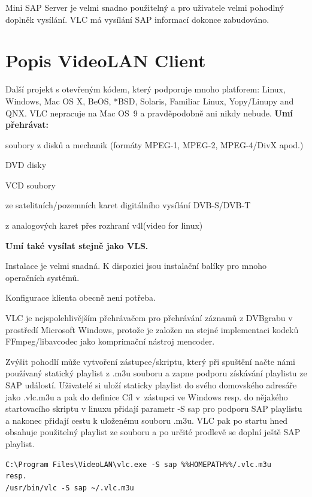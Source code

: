 Mini SAP Server je velmi snadno použitelný a pro uživatele velmi pohodlný doplněk vysílání. VLC má vysílání SAP informací dokonce zabudováno.

\section{Popis VideoLAN Client}

Další projekt s otevřeným kódem, který podporuje mnoho platforem: Linux, Windows, Mac OS X, BeOS, *BSD, Solaris, Familiar Linux, Yopy/Linupy and QNX. VLC nepracuje na Mac OS\ 9 a pravděpodobně ani nikdy nebude.
\vfill
\pagebreak
\textbf{Umí přehrávat:}
\bitem
\item soubory z disků a mechanik (formáty MPEG-1, MPEG-2, MPEG-4/DivX apod.)
\item DVD disky
\item VCD soubory
\item ze satelitních/pozemních karet digitálního vysílání DVB-S/DVB-T
\item z analogových karet přes rozhraní v4l(video for linux)
\eitem

\textbf{Umí také vysílat stejně jako VLS.}

Instalace je velmi snadná. K dispozici jsou instalační balíky pro mnoho operačních systémů.

Konfigurace klienta obecně není potřeba. 

VLC je nejspolehlivějším přehrávačem pro přehrávání záznamů z DVBgrabu v prostředí Microsoft Windows, protože je založen na stejné implementaci kodeků FFmpeg/libavcodec jako komprimační nástroj mencoder.

Zvýšit pohodlí může vytvoření zástupce/skriptu, který při spuštění načte námi používaný statický playlist z .m3u souboru a zapne podporu získávání playlistu ze SAP událostí. Uživatelé si uloží staticky playlist do svého domovského adresáře jako .vlc.m3u a pak do definice Cíl v~zástupci ve Windows resp. do nějakého startovacího skriptu v linuxu přidají parametr -S sap pro podporu SAP playlistu a nakonec přidají cestu k uloženému souboru .m3u. VLC pak po startu hned obsahuje použitelný playlist ze souboru a po určité prodlevě se doplní ještě SAP playlist.

\begin{small}
\begin{verbatim}
C:\Program Files\VideoLAN\vlc.exe -S sap %%HOMEPATH%%/.vlc.m3u
resp.
/usr/bin/vlc -S sap ~/.vlc.m3u
\end{verbatim}
\end{small}


